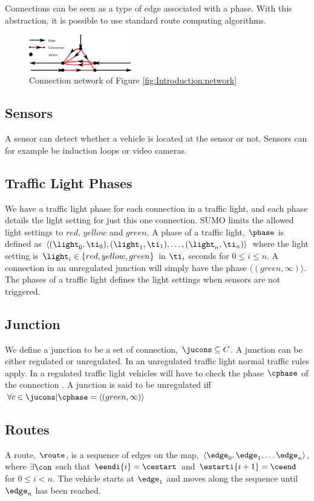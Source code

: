 Connections can be seen as a type of edge associated with a phase.
With this abstraction, it is possible to use standard route computing algorithms.

\begin{figure}[h]
\centering
\includegraphics[width=0.4\textwidth]{../images/ConnectionNetwork.png}
\caption{Connection network of Figure \ref{fig:Introduction:network}}
\label{fig:Model:Connection}
\end{figure}

\subsection{Sensors}
A sensor can detect whether a vehicle is located at the sensor or not. 
Sensors can for example be induction loops or video cameras. %

\subsection{Traffic Light Phases}
We have a traffic light phase for each connection in a traffic light, and each phase details the light setting for just this one connection.
SUMO limits the allowed light settings to $red$, $yellow$ and $green$.
A phase of a traffic light, $\phase$ is defined as $\langle(\light_0, \ti_0),(\light_1, \ti_1),\dots, (\light_n, \ti_n) \rangle$ where the light setting is $\light_i\in \{red, yellow, green\}$ in $\ti_i$ seconds for $0 \leq i \leq n$.
A connection in an unregulated junction will simply have the phase $\langle(green, \infty)\rangle$.
The phases of a traffic light defines the light settings when sensors are not triggered. 


\subsection{Junction}
We define a junction \ju to be a set of connection, $\jucons \subseteq C$. 
A junction can be either regulated or unregulated. 
In an unregulated traffic light normal traffic rules apply. 
In a regulated traffic light vehicles will have to check the phase $\cphase$ of the connection \vehpos. 
A junction is said to be unregulated iff $\forall c \in \jucons | \cphase = \langle(green, \infty)\rangle$

\subsection{Routes}
A route, $\route$, is a sequence of edges on the map, $\langle \edge_0, \edge_1, \dots \edge_n \rangle$, where $\exists \con$ such that $\eendi{i} = \cestart$ and $\estarti{i+1} = \ceend$ for $0\leq i< n$.
The vehicle starts at $\edge_1$ and moves along the sequence until $\edge_n$ has been reached.